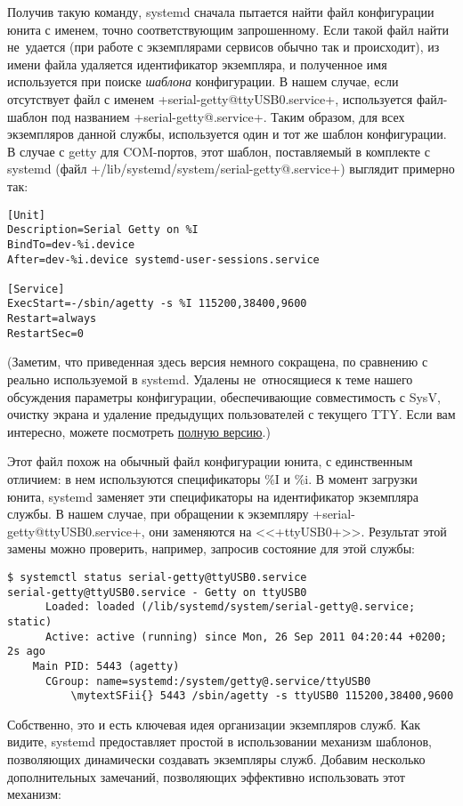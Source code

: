 \documentclass[10pt,oneside,a4paper]{article}
\newcommand{\mytextSFii}{\raisebox{0pt}[0pt][\depth]{%
	\reflectbox{\rotatebox[origin=t]{270}{$\neg$}}}}
\begin{document}
Получив такую команду, systemd сначала пытается найти файл конфигурации юнита с
именем, точно соответствующим запрошенному. Если такой файл найти не~удается
(при работе с экземплярами сервисов обычно так и происходит), из имени файла
удаляется идентификатор экземпляра, и полученное имя используется при поиске
\emph{шаблона} конфигурации. В нашем случае, если отсутствует файл с именем
+serial-getty@ttyUSB0.service+, используется файл-шаблон под названием
+serial-getty@.service+. Таким образом, для всех экземпляров данной службы,
используется один и тот же шаблон конфигурации. В случае с getty для COM-портов,
этот шаблон, поставляемый в комплекте с systemd
(файл +/lib/systemd/system/serial-getty@.service+) выглядит примерно так:
\begin{Verbatim}
[Unit]
Description=Serial Getty on %I
BindTo=dev-%i.device
After=dev-%i.device systemd-user-sessions.service

[Service]
ExecStart=-/sbin/agetty -s %I 115200,38400,9600
Restart=always
RestartSec=0
\end{Verbatim}
(Заметим, что приведенная здесь версия немного сокращена, по сравнению с реально
используемой в systemd. Удалены не~относящиеся к теме нашего обсуждения
параметры конфигурации, обеспечивающие совместимость с SysV, очистку экрана и
удаление предыдущих пользователей с текущего TTY. Если вам интересно, можете
посмотреть
\href{http://cgit.freedesktop.org/systemd/plain/units/serial-getty@.service.m4}{полную
версию}.)

Этот файл похож на обычный файл конфигурации юнита, с единственным отличием: в
нем используются спецификаторы \%I и \%i. В момент загрузки юнита, systemd
заменяет эти спецификаторы на идентификатор экземпляра службы. В нашем случае,
при обращении к экземпляру +serial-getty@ttyUSB0.service+, они заменяются на
<<+ttyUSB0+>>. Результат этой замены можно проверить, например, запросив
состояние для этой службы:
\begin{Verbatim}[commandchars=\\\{\}]
$ systemctl status serial-getty@ttyUSB0.service
serial-getty@ttyUSB0.service - Getty on ttyUSB0
	  Loaded: loaded (/lib/systemd/system/serial-getty@.service; static)
	  Active: active (running) since Mon, 26 Sep 2011 04:20:44 +0200; 2s ago
	Main PID: 5443 (agetty)
	  CGroup: name=systemd:/system/getty@.service/ttyUSB0
		  \mytextSFii{} 5443 /sbin/agetty -s ttyUSB0 115200,38400,9600
\end{Verbatim}
Собственно, это и есть ключевая идея организации экземпляров служб. Как видите,
systemd предоставляет простой в использовании механизм шаблонов, позволяющих
динамически создавать экземпляры служб. Добавим несколько дополнительных
замечаний, позволяющих эффективно использовать этот механизм:
\end{document}
